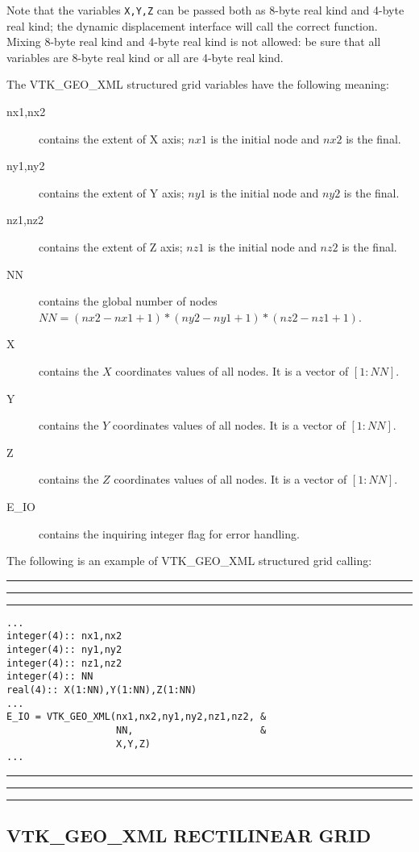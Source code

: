 \documentclass[pagesize=pdftex,fontsize=10pt,paper=a4,oneside]{scrbook}
\DeclareRobustCommand{\MarginNote}[1]{\marginpar{%
\slshape\footnotesize%
\parindent=0pt\lineskip=0pt\lineskiplimit=0pt%
\tolerance=2000\hyphenpenalty=300\exhyphenpenalty=300%
\doublehyphendemerits=100000\finalhyphendemerits=\doublehyphendemerits%
\raggedright\hspace{0pt}#1}}
\newenvironment{boxred}[1]%
               {%
                \noindent\hspace*{-0.025\textwidth}%
                \color{Maroon}%
                \rule[-5.8pt]{0.6pt}{6pt}\hspace*{-0.6pt}\rule{1.05\textwidth}{0.6pt}\hspace*{-0.6pt}\rule[-5.8pt]{0.6pt}{6pt}%
                \color{black}%
                \vspace*{0.6pt}\MarginNote{\color{Maroon}{#1}}%
               }%
               {%
                \noindent\hspace*{-0.025\textwidth}%
                \color{Maroon}%
                \rule[0pt]{0.6pt}{6pt}\hspace*{-0.6pt}\rule{1.05\textwidth}{0.6pt}\hspace*{-0.6pt}\rule[0pt]{0.6pt}{6pt}%
                \color{black}%
                \vspace*{2mm}%
               }
\begin{document}
Note that the variables \texttt{X,Y,Z} can be passed both as 8-byte real kind and 4-byte real kind; the dynamic displacement
interface will call the correct function. Mixing 8-byte real kind and 4-byte real kind is not allowed: be sure that all
variables are 8-byte real kind or all are 4-byte real kind.

The VTK\_GEO\_XML structured grid variables have the following meaning:

\begin{description}
 \item[{\color{RoyalBlue}nx1,nx2}] contains the extent of X axis; $nx1$ is the initial node and $nx2$ is the final.
 \item[{\color{RoyalBlue}ny1,ny2}] contains the extent of Y axis; $ny1$ is the initial node and $ny2$ is the final.
 \item[{\color{RoyalBlue}nz1,nz2}] contains the extent of Z axis; $nz1$ is the initial node and $nz2$ is the final.
 \item[{\color{RoyalBlue}NN}] contains the global number of nodes $NN=(nx2-nx1+1)*(ny2-ny1+1)*(nz2-nz1+1)$.
 \item[{\color{RoyalBlue}X}] contains the $X$ coordinates values of all nodes. It is a vector of $[1:NN]$.
 \item[{\color{RoyalBlue}Y}] contains the $Y$ coordinates values of all nodes. It is a vector of $[1:NN]$.
 \item[{\color{RoyalBlue}Z}] contains the $Z$ coordinates values of all nodes. It is a vector of $[1:NN]$.
 \item[{\color{RoyalBlue}E\_IO}] contains the inquiring integer flag for error handling.
\end{description}

The following is an example of VTK\_GEO\_XML structured grid calling:

\begin{boxred}{VTK\_GEO\_XML Structured Grid Calling}
\begin{verbatim}
...
integer(4):: nx1,nx2
integer(4):: ny1,ny2
integer(4):: nz1,nz2
integer(4):: NN
real(4):: X(1:NN),Y(1:NN),Z(1:NN)
...
E_IO = VTK_GEO_XML(nx1,nx2,ny1,ny2,nz1,nz2, &
                   NN,                      &
                   X,Y,Z)
...
\end{verbatim}
\end{boxred}

\subsection{VTK\_GEO\_XML RECTILINEAR GRID}
\end{document}
